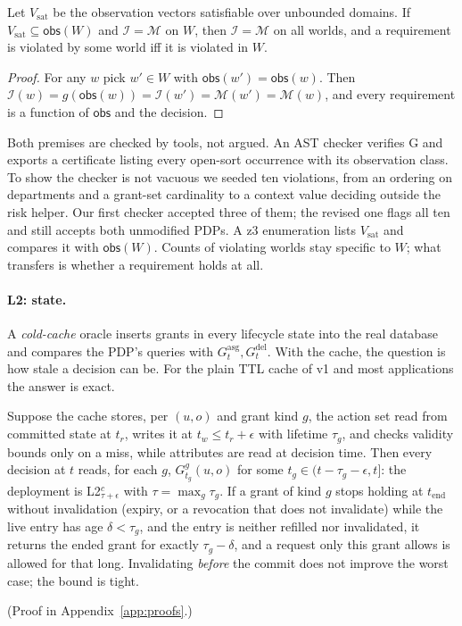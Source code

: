 \documentclass[sigconf,review,anonymous]{acmart}
\newcommand{\Gasg}{G^{\mathrm{asg}}}
\newcommand{\Gdel}{G^{\mathrm{del}}}
\newcommand{\obs}{\mathsf{obs}}
\begin{document}
\begin{theorem}\label{thm:complete}
Let $V_{\mathrm{sat}}$ be the observation vectors satisfiable over unbounded domains. If
$V_{\mathrm{sat}}\subseteq\obs(W)$ and $\mathcal{I}=\mathcal{M}$ on $W$, then $\mathcal{I}=\mathcal{M}$ on all
worlds, and a requirement is violated by some world iff it is violated in $W$.
\end{theorem}
\begin{proof}
For any $w$ pick $w'\in W$ with $\obs(w')=\obs(w)$. Then $\mathcal{I}(w)=g(\obs(w))=\mathcal{I}(w')=\mathcal{M}(w')
=\mathcal{M}(w)$, and every requirement is a function of $\obs$ and the decision.
\end{proof}

Both premises are checked by tools, not argued. An AST checker verifies G and exports a certificate listing every
open-sort occurrence with its observation class. To show the checker is not vacuous we seeded ten violations, from an ordering on
departments and a grant-set cardinality to a context value deciding outside the risk helper. Our first checker
accepted three of them; the revised one flags all ten and still accepts both unmodified PDPs. A z3 enumeration
lists $V_{\mathrm{sat}}$ and compares it with $\obs(W)$. Counts of violating worlds stay specific to $W$; what
transfers is whether a requirement holds at all.

\paragraph{L2: state.} A \emph{cold-cache} oracle inserts grants in every lifecycle state into the real database
and compares the PDP's queries with $\Gasg_t,\Gdel_t$. With the cache, the question is how stale a decision can
be. For the plain TTL cache of v1 and most applications the answer is exact.

\begin{theorem}\label{thm:stale}
Suppose the cache stores, per $(u,o)$ and grant kind $g$, the action set read from committed state at $t_r$, writes
it at $t_w\le t_r+\epsilon$ with lifetime $\tau_g$, and checks validity bounds only on a miss, while attributes
are read at decision time. Then every decision at $t$ reads, for each $g$, $G^g_{t_g}(u,o)$ for some
$t_g\in(t-\tau_g-\epsilon,t]$: the deployment is L2$^c_{\tau+\epsilon}$ with $\tau=\max_g\tau_g$. If a grant of kind
$g$ stops holding at $t_{\mathrm{end}}$ without invalidation (expiry, or a revocation that does not invalidate)
while the live entry has age $\delta<\tau_g$, and the entry is neither refilled nor invalidated, it returns the
ended grant for exactly $\tau_g-\delta$, and a request only this grant allows is allowed for that long.
Invalidating \emph{before} the commit does not improve the worst case; the bound is tight.
\end{theorem}
(Proof in Appendix~\ref{app:proofs}.)
\end{document}
